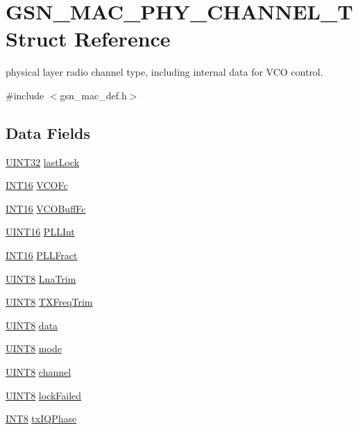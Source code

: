 \hypertarget{a00118}{
\section{GSN\_\-MAC\_\-PHY\_\-CHANNEL\_\-T Struct Reference}
\label{a00118}
}


physical layer radio channel type, including internal data for VCO control.  




{\ttfamily \#include $<$gsn\_\-mac\_\-def.h$>$}

\subsection*{Data Fields}
\begin{DoxyCompactItemize}
\item 
\hyperlink{a00660_gae1e6edbbc26d6fbc71a90190d0266018}{UINT32} \hyperlink{a00118_a37be54f8caefdc9dc22a3e2d26f78ce1}{lastLock}
\item 
\hyperlink{a00660_ga57de7cb8e702b1746127a4d5137fa455}{INT16} \hyperlink{a00118_a3165686ca2c06ae0132dc42c1f4316db}{VCOFc}
\item 
\hyperlink{a00660_ga57de7cb8e702b1746127a4d5137fa455}{INT16} \hyperlink{a00118_a92c94d34982d29cc4005e3786f3d9935}{VCOBuffFc}
\item 
\hyperlink{a00660_ga09f1a1fb2293e33483cc8d44aefb1eb1}{UINT16} \hyperlink{a00118_a27439896821d171d0e83bc12b4056179}{PLLInt}
\item 
\hyperlink{a00660_ga57de7cb8e702b1746127a4d5137fa455}{INT16} \hyperlink{a00118_a3b4c97c06bded5461348a682c422b324}{PLLFract}
\item 
\hyperlink{a00660_gab27e9918b538ce9d8ca692479b375b6a}{UINT8} \hyperlink{a00118_ae9b7edd0a8aac39749a458bbf1a52019}{LnaTrim}
\item 
\hyperlink{a00660_gab27e9918b538ce9d8ca692479b375b6a}{UINT8} \hyperlink{a00118_a74c255aeaa7c0c0fd92081b7663cc183}{TXFreqTrim}
\item 
\hyperlink{a00660_gab27e9918b538ce9d8ca692479b375b6a}{UINT8} \hyperlink{a00118_adb3d5f23cbb56c00a8e639b8d52f0e2a}{data}
\item 
\hyperlink{a00660_gab27e9918b538ce9d8ca692479b375b6a}{UINT8} \hyperlink{a00118_a7d61d79fa98a45545166420dec0d8f3d}{mode}
\item 
\hyperlink{a00660_gab27e9918b538ce9d8ca692479b375b6a}{UINT8} \hyperlink{a00118_a52d69a3bd7bdfdfc6f9e40f4962c575d}{channel}
\item 
\hyperlink{a00660_gab27e9918b538ce9d8ca692479b375b6a}{UINT8} \hyperlink{a00118_a93bddff7a1829758bf84927c8cd37b66}{lockFailed}
\item 
\hyperlink{a00660_ga307b8734c020247f6bac4fcde0dcfbb9}{INT8} \hyperlink{a00118_a41688730f143281331d4a78967fcf24e}{txIQPhase}
\end{DoxyCompactItemize}


